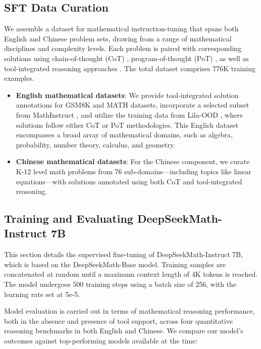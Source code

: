 \subsection{SFT Data Curation}

We assemble a dataset for mathematical instruction-tuning that spans both English and Chinese problem sets, drawing from a range of mathematical disciplines and complexity levels. Each problem is paired with corresponding solutions using chain-of-thought (CoT) \citep{cot}, program-of-thought (PoT) \citep{pot,pal}, as well as tool-integrated reasoning approaches \citep{tora}. The total dataset comprises 776K training examples.

\begin{itemize}[topsep=0pt]
    \item \textbf{English mathematical datasets}: We provide tool-integrated solution annotations for GSM8K and MATH datasets, incorporate a selected subset from MathInstruct \citep{MathInstruct}, and utilize the training data from Lila-OOD \citep{lila}, where solutions follow either CoT or PoT methodologies. This English dataset encompasses a broad array of mathematical domains, such as algebra, probability, number theory, calculus, and geometry.
    \item \textbf{Chinese mathematical datasets}: For the Chinese component, we curate K-12 level math problems from 76 sub-domains—including topics like linear equations—with solutions annotated using both CoT and tool-integrated reasoning.
\end{itemize}

\subsection{Training and Evaluating DeepSeekMath-Instruct 7B}

This section details the supervised fine-tuning of DeepSeekMath-Instruct 7B, which is based on the DeepSeekMath-Base model. Training samples are concatenated at random until a maximum context length of 4K tokens is reached. The model undergoes 500 training steps using a batch size of 256, with the learning rate set at 5e-5.

Model evaluation is carried out in terms of mathematical reasoning performance, both in the absence and presence of tool support, across four quantitative reasoning benchmarks in both English and Chinese. We compare our model’s outcomes against top-performing models available at the time:

